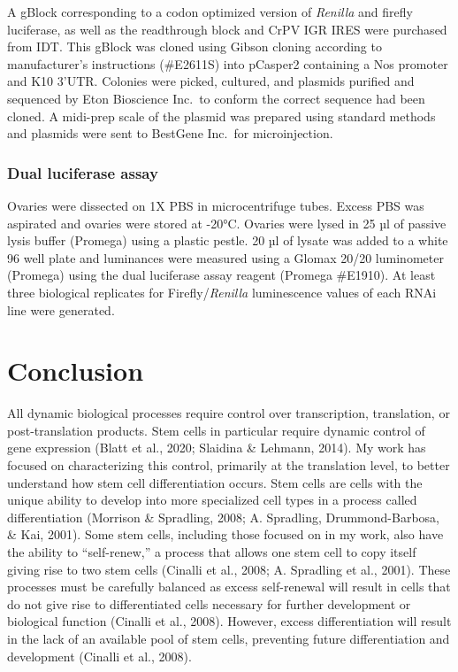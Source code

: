 \documentclass[12pt,oneside]{reedthesis}
\begin{document}
A gBlock corresponding to a codon optimized version of \emph{Renilla} and
firefly luciferase, as well as the readthrough block and CrPV IGR IRES
were purchased from IDT. This gBlock was cloned using Gibson cloning
according to manufacturer's instructions (\#E2611S) into pCasper2
containing a Nos promoter and K10 3'UTR. Colonies were picked, cultured,
and plasmids purified and sequenced by Eton Bioscience Inc.~to conform
the correct sequence had been cloned. A midi-prep scale of the plasmid
was prepared using standard methods and plasmids were sent to BestGene
Inc.~for microinjection.

\hypertarget{dual-luciferase-assay}{%
\subsection{Dual luciferase assay}\label{dual-luciferase-assay}}

Ovaries were dissected on 1X PBS in microcentrifuge tubes. Excess PBS
was aspirated and ovaries were stored at -20°C. Ovaries were lysed in 25
µl of passive lysis buffer (Promega) using a plastic pestle. 20 µl of
lysate was added to a white 96 well plate and luminances were measured
using a Glomax 20/20 luminometer (Promega) using the dual luciferase
assay reagent (Promega \#E1910). At least three biological replicates
for Firefly/\emph{Renilla} luminescence values of each RNAi line were
generated.

\setlength\parindent{24pt}

\hypertarget{conclusion}{%
\chapter{Conclusion}\label{conclusion}}

All dynamic biological processes require control over transcription, translation, or post-translation products. Stem cells in particular require dynamic control of gene expression (Blatt et al., 2020; Slaidina \& Lehmann, 2014). My work has focused on characterizing this control, primarily at the translation level, to better understand how stem cell differentiation occurs. Stem cells are cells with the unique ability to develop into more specialized cell types in a process called differentiation (Morrison \& Spradling, 2008; A. Spradling, Drummond-Barbosa, \& Kai, 2001). Some stem cells, including those focused on in my work, also have the ability to ``self-renew,'' a process that allows one stem cell to copy itself giving rise to two stem cells (Cinalli et al., 2008; A. Spradling et al., 2001). These processes must be carefully balanced as excess self-renewal will result in cells that do not give rise to differentiated cells necessary for further development or biological function (Cinalli et al., 2008). However, excess differentiation will result in the lack of an available pool of stem cells, preventing future differentiation and development (Cinalli et al., 2008).
\end{document}
